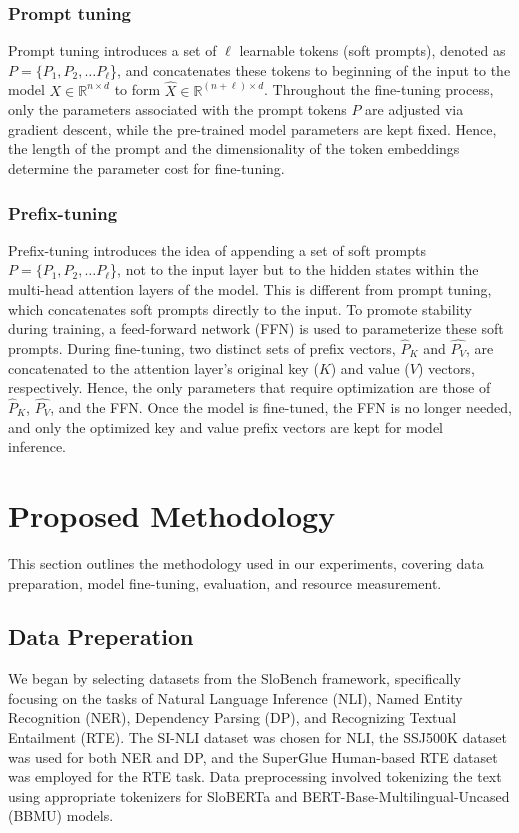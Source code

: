 \documentclass[fleqn,moreauthors,10pt]{ds_report}
\begin{document}
\subsubsection*{Prompt tuning}
Prompt tuning introduces a set of $\ell$ learnable tokens (soft prompts), denoted as $P =  \{P_1, P_2, \dots P_\ell$\},  and concatenates these tokens to beginning of the input to the model $X \in \mathbb{R}^{n\times d}$ to form $\hat{X} \in \mathbb{R}^{(n + \ell) \times d}$. Throughout the fine-tuning process, only the parameters associated with the prompt tokens $P$ are adjusted via gradient descent, while the pre-trained model parameters are kept fixed. Hence, the length of the prompt and the dimensionality of the token embeddings determine the parameter cost for fine-tuning.~\cite{prompt_tuning} 

\subsubsection*{Prefix-tuning}
Prefix-tuning introduces the idea of appending a set of soft prompts $P =  \{P_1, P_2, \dots P_\ell$\}, not to the input layer but to the hidden states within the multi-head attention layers of the model. This is different from prompt tuning, which concatenates  soft prompts directly to the input. To promote stability during training, a feed-forward network (FFN) is used to parameterize these soft prompts. During fine-tuning, two distinct sets of prefix vectors, $\hat{P}_K$ and $\hat{P_V}$, are concatenated to the attention layer's original key ($K$) and value ($V$) vectors, respectively. Hence, the only parameters that require optimization are those of $\hat{P}_K$, $\hat{P_V}$, and the FFN. Once the model is fine-tuned, the FFN is no longer needed, and only the optimized key and value prefix vectors are kept for model inference.~\cite{prefix_tuning}


\section{Proposed Methodology}
This section outlines the methodology used in our experiments, covering data preparation, model fine-tuning, evaluation, and resource measurement.

\subsection{Data Preperation}
We began by selecting datasets from the SloBench framework, specifically focusing on the tasks of Natural Language Inference (NLI), Named Entity Recognition (NER), Dependency Parsing (DP), and Recognizing Textual Entailment (RTE). The SI-NLI dataset was chosen for NLI, the SSJ500K dataset was used for both NER and DP, and the SuperGlue Human-based RTE dataset was employed for the RTE task. Data preprocessing involved tokenizing the text using appropriate tokenizers for SloBERTa and BERT-Base-Multilingual-Uncased (BBMU) models.
\end{document}
